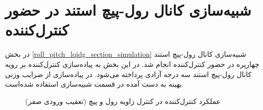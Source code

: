 \section{شبیه‌سازی کانال رول-پیچ استند در حضور کنترل‌کننده }\label{roll_pitch_lqidg_section}
در بخش
\ref{roll_pitch_lqidg_section_simulation}
شبیه‌سازی کانال رول-پیچ استند چهارپره در حضور کنترل‌کننده  انجام شد. در این بخش به پیاده‌سازی کنترل‌کننده  بر رویه کانال رول-پیچ استند سه درجه آزادی پرداخته می‌شود.
در پیاده‌سازی از ضرایب وزنی بهینه به دست آمده در قسمت شبیه‌سازی استفاده شده‌است.

\begin{figure}[H]
	\centering
	\caption{‫‪عملکرد کنترل‌کننده  در کنترل زاویه رول و پیچ (تعقیب ورودی صفر)}
\end{figure}

